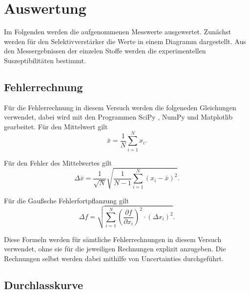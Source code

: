 \section{Auswertung}
\label{sec:auswertung}
 Im Folgenden werden die aufgenommenen Messwerte ausgewertet. Zunächst werden für den Selektivverstärker 
 die Werte in einem Diagramm dargestellt. Aus den Messergebnissen der einzelen Stoffe werden die 
 experimentellen Suszeptibilitäten bestimmt.

\subsection{Fehlerrechnung}
\label{sec:Fehlerrechnung}
Für die Fehlerrechnung in diesem Versuch werden die folgeneden Gleichungen verwendet, dabei wird mit den Programmen
SciPy \cite{scipy}, NumPy \cite{numpy} und Matplotlib \cite{matplotlib} gearbeitet.
    Für den Mittelwert gilt
    \begin{equation}
    \bar{x} = \frac{1}{N}\sum\limits_{i = 1}^N x_i .
    \end{equation}

    Für den Fehler des Mittelwertes gilt
    \begin{equation}
        \Delta \bar{x}=\frac{1}{\sqrt{N}} \sqrt{\frac{1}{N-1} \sum_{i=1}^N\left(x_i-\bar{x}\right)^2}.
        \label{eqn:mittelwert}
        \end{equation}

    Für die Gaußsche Fehlerfortpflanzung gilt
    \begin{equation}
        \Delta f=\sqrt{\sum_{i=1}^N\left(\frac{\partial f}{\partial x_i}\right)^2 \cdot\left(\Delta x_i\right)^2}.
    \end{equation}

    Diese Formeln werden für sämtliche Fehlerrechnungen in diesem Versuch verwendet, ohne sie für die 
    jeweiligen Rechnungen explizit anzugeben. Die Rechnungen selbst werden dabei mithilfe von
    Uncertainties durchgeführt.

\subsection{Durchlasskurve}
\label{sec:Durchlasskurve}

